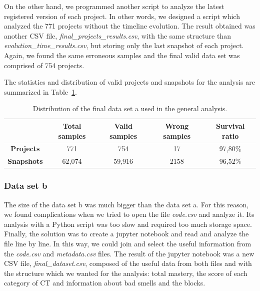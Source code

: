 On the other hand, we programmed another script to analyze the latest registered version of each project. In other words, we designed a script which analyzed the 771 projects without the timeline evolution. The result obtained was another CSV file, \textit{final\_projects\_results.csv}, with the same structure than \textit{evolution\_time\_results.csv}, but storing only the last snapshot of each project. Again, we found the same erroneous samples and the final valid data set was comprised of 754 projects.

The statistics and distribution of valid projects and snapshots for the analysis are summarized in Table~\ref{table:datacollection_a}.

\begin{table}
 \begin{center}
  \begin{tabular}{|c|c|c|c|c|}
    \hline
     & \textbf{Total samples} & \textbf{Valid samples} & \textbf{Wrong samples} & \textbf{Survival ratio} \\ \hline
    \textbf{Projects} & 771 & 754 & 17 & 97,80\% \\ \hline
    \textbf{Snapshots}& 62,074 & 59,916 & 2158 & 96,52\% \\ \hline
  \end{tabular}
  \caption{Distribution of the final data set a used in the general analysis.}
  \label{table:datacollection_a}
 \end{center}
\end{table}


\subsubsection{Data set b}
\label{subsubsec:datacollection_b}

The size of the data set b was much bigger than the data set a. For this reason, we found complications when we tried to open the file \textit{code.csv} and analyze it. Its analysis with a Python script was too slow and required too much storage space. Finally, the solution was to create a jupyter notebook and read and analyze the file line by line. In this way, we could join and select the useful information from the \textit{code.csv} and \textit{metadata.csv} files. The result of the jupyter notebook was a new CSV file, \textit{final\_dataset.csv}, composed of the useful data from both files and with the structure which we wanted for the analysis: total mastery, the score of each category of CT and information about bad smells and the blocks. 

